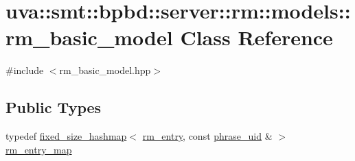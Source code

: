 \hypertarget{classuva_1_1smt_1_1bpbd_1_1server_1_1rm_1_1models_1_1rm__basic__model}{}\section{uva\+:\+:smt\+:\+:bpbd\+:\+:server\+:\+:rm\+:\+:models\+:\+:rm\+\_\+basic\+\_\+model Class Reference}
\label{classuva_1_1smt_1_1bpbd_1_1server_1_1rm_1_1models_1_1rm__basic__model}


{\ttfamily \#include $<$rm\+\_\+basic\+\_\+model.\+hpp$>$}

\subsection*{Public Types}
\begin{DoxyCompactItemize}
\item 
typedef \hyperlink{classuva_1_1utils_1_1containers_1_1fixed__size__hashmap}{fixed\+\_\+size\+\_\+hashmap}$<$ \hyperlink{namespaceuva_1_1smt_1_1bpbd_1_1server_1_1rm_1_1models_a67353bb21590b2a2adf05500899439ed}{rm\+\_\+entry}, const \hyperlink{namespaceuva_1_1smt_1_1bpbd_1_1server_ad18d4cdf5504e76c22b0c124ff60b44f}{phrase\+\_\+uid} \& $>$ \hyperlink{classuva_1_1smt_1_1bpbd_1_1server_1_1rm_1_1models_1_1rm__basic__model_a64429cdf5101527707c9ff2b1bbbb40a}{rm\+\_\+entry\+\_\+map}
\end{DoxyCompactItemize}
